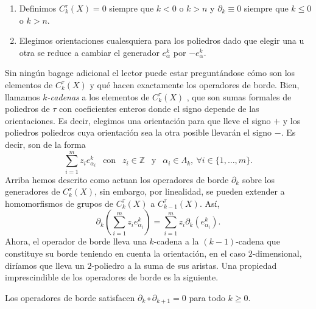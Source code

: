 \begin{remark}\hfill
    \begin{enumerate}[label=(\roman*)]
        \item Definimos $C^{\tau}_k(X) = 0$ siempre que $k<0$ o $k>n$ y $\partial_k \equiv 0$ siempre que $k\le 0$ o $k>n$.
        \item Elegimos orientaciones cualesquiera para los poliedros dado que elegir una u otra se reduce a cambiar el generador $e^k_{\alpha}$ por $-e^k_{\alpha}$.
    \end{enumerate}
\end{remark}

\bigskip

Sin ningún bagage adicional el lector puede estar preguntándose cómo son los elementos de $C^{\tau}_k(X)$ y qué hacen exactamente los operadores de borde. Bien, llamamos \textit{$k$-cadenas} a los elementos de $C^{\tau}_k(X)$ , que son sumas formales de poliedros de $\tau$ con coeficientes enteros donde el signo depende de las orientaciones. Es decir, elegimos una orientación para que lleve el signo $+$ y los poliedros poliedros cuya orientación sea la otra posible llevarán el signo $-$. Es decir, son de la forma
\begin{equation*}
    \sum_{i=1}^m z_i e^k_{\alpha_i} ~~\text{ con }~~ z_i \in \mathbb{Z} ~~\text{ y }~~ \alpha_i \in \Lambda_k, ~\forall i\in \{1,\dots, m\}.
\end{equation*}
Arriba hemos descrito como actuan los operadores de borde $\partial_k$ sobre los generadores de $C^{\tau}_k(X)$, sin embargo, por linealidad, se pueden extender a homomorfismos de grupos de $C^{\tau}_k(X)$ a $C^{\tau}_{k-1}(X)$. Así,
\begin{equation*}
    \partial_k \left( \sum_{i=1}^m z_i e^k_{\alpha_i} \right) = \sum_{i=1}^m z_i \partial_k (e^k_{\alpha_i}). 
\end{equation*}
Ahora, el operador de borde lleva una $k$-cadena a la $(k-1)$-cadena que constituye su borde teniendo en cuenta la orientación, en el caso $2$-dimensional, diríamos que lleva un $2$-poliedro a la suma de sus aristas. Una propiedad imprescindible de los operadores de borde es la siguiente.

\begin{proposition}
    Los operadores de borde satisfacen $\partial_{k}\circ\partial_{k+1}=0$ para todo $k\ge 0$.
\end{proposition}


